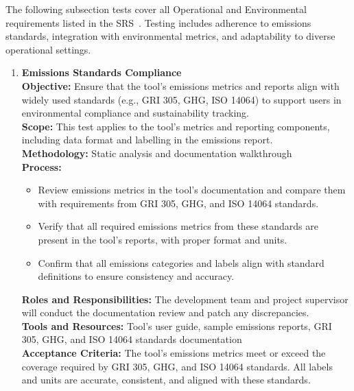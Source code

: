 \documentclass[12pt, titlepage]{article}
\begin{document}
\medskip

\noindent
The following subsection tests cover all Operational and Environmental requirements listed in the SRS~\cite{SRS}. Testing includes adherence to emissions standards, integration with environmental metrics, and adaptability to diverse operational settings.

\begin{enumerate}[label={\bf \textcolor{Maroon}{test-OPE-\arabic*}}, wide=0pt, font=\itshape]
  \item \textbf{Emissions Standards Compliance} \\[2mm]
    \textbf{Objective:} Ensure that the tool’s emissions metrics and reports align with widely used standards (e.g., GRI 305, GHG, ISO 14064) to support users in environmental compliance and sustainability tracking. \\[2mm]
    \textbf{Scope:} This test applies to the tool's metrics and reporting components, including data format and labelling in the emissions report. \\[2mm]
    \textbf{Methodology:} Static analysis and documentation walkthrough \\[2mm]
    \textbf{Process:}
    \begin{itemize}
      \item Review emissions metrics in the tool’s documentation and compare them with requirements from GRI 305, GHG, and ISO 14064 standards.
      \item Verify that all required emissions metrics from these standards are present in the tool’s reports, with proper format and units.
      \item Confirm that all emissions categories and labels align with standard definitions to ensure consistency and accuracy.
    \end{itemize}
    \textbf{Roles and Responsibilities:} The development team and project supervisor will conduct the documentation review and patch any discrepancies. \\[2mm]
    \textbf{Tools and Resources:} Tool’s user guide, sample emissions reports, GRI 305, GHG, and ISO 14064 standards documentation \\[2mm]
    \textbf{Acceptance Criteria:} The tool’s emissions metrics meet or exceed the coverage required by GRI 305, GHG, and ISO 14064 standards. All labels and units are accurate, consistent, and aligned with these standards.



\end{enumerate}
\end{document}
